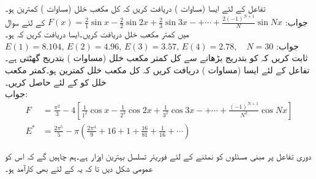 \quad تفاعل  کے لئے ایسا  (مساوات ) دریافت کریں کہ کل مکعب خلل (مساوات ) کمترین ہو۔ \\
جواب:\quad
$F(x)=\tfrac{2}{1}\sin x-\tfrac{2}{2}\sin 2x+\tfrac{2}{3}\sin 3x-+\cdots +\tfrac{2(-1)^{N+1}}{N}\sin Nx$
\quad {} کے لئے سوال  میں کمتر مکعب خلل دریافت کریں۔ایسا  دریافت کریں کہ  ہو۔\\
جواب:\quad
$E(1)=8.104,\,E(2)=4.96,\,E(3)=3.57,\,E(4)=2.78,\quad N=30$
\quad ثابت کریں کہ  کو بتدریج بڑھانے سے کل کمتر مکعب خلل  (مساوات ) بتدریج گھٹتی ہے۔ 
\quad  تفاعل  کے لئے ایسا  (مساوات ) دریافت کریں کہ کل مکعب خلل کمترین ہو۔کمتر مکعب خلل کو  کے لئے حاصل کریں۔\\
جواب:
\begin{align*}
F&=\tfrac{\pi^2}{3}-4[\tfrac{1}{1^2}\cos x-\tfrac{1}{2^2}\cos 2x+\tfrac{1}{3^2}\cos 3x-+\cdots +\tfrac{(-1)^{N+1}}{N^2}\cos Nx]\\
E^* &=\tfrac{2\pi^5}{5}-\pi(\tfrac{2\pi^4}{9}+16+1+\tfrac{16}{81}+\tfrac{1}{16}+\cdots)
\end{align*}

دوری تفاعل پر مبنی مسئلوں کو نمٹنے کے لئے فوریئر تسلسل بہترین اوزار ہے۔ہم چاہیں گے کہ اس  کو عمومی شکل دیں تا کہ یہ  کے لئے بھی کارآمد ہو۔ 

